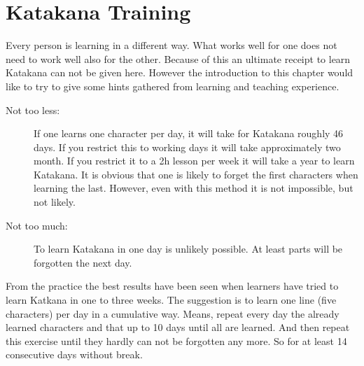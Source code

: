 \chapter{Katakana Training}\label{chap:KatakanaTraining}

\normalsize

Every person is learning in a different way. What works well for one does not
need to work well also for the other. Because of this an ultimate receipt to
learn Katakana can not be given here. However the introduction to this chapter
would like to try to give some  hints gathered from learning and teaching
experience. 

\begin{description}

\item[Not too less:] If one learns one character per day, it will take for
Katakana roughly 46 days.  If you restrict this to working days it will take
approximately two month. If you restrict it to a 2h lesson per week it will
take a year to learn Katakana. It is obvious that one is likely to forget the
first characters when learning the last. However, even with this method it is
not impossible, but not likely.

\item[Not too much:]  To learn Katakana in one day is unlikely possible. At
least parts will be forgotten the next day.

\end{description}

From the practice the best results have been seen when learners have tried to
learn Katkana in one to three weeks. The suggestion is to learn one line (five
characters) per day in a cumulative way. Means, repeat every day the already
learned characters and that up to 10 days until all are learned. And then
repeat this exercise until they hardly can not be forgotten any more. So for
at least 14 consecutive days without break. 

